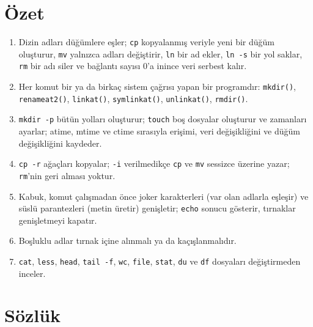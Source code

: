 \documentclass[11pt,a4paper]{article}
\newcommand{\cmd}[1]{\texttt{#1}}
\begin{document}
\section{Özet}

\begin{keyidea}
\begin{enumerate}[leftmargin=1.4em]
  \item Dizin adları düğümlere eşler; \cmd{cp} kopyalanmış veriyle yeni bir düğüm oluşturur, \cmd{mv} yalnızca adları değiştirir, \cmd{ln} bir ad ekler, \cmd{ln -s} bir yol saklar, \cmd{rm} bir adı siler ve bağlantı sayısı $0$'a inince veri serbest kalır.
  \item Her komut bir ya da birkaç sistem çağrısı yapan bir programdır: \cmd{mkdir()}, \cmd{renameat2()}, \cmd{linkat()}, \cmd{symlinkat()}, \cmd{unlinkat()}, \cmd{rmdir()}.
  \item \cmd{mkdir -p} bütün yolları oluşturur; \cmd{touch} boş dosyalar oluşturur ve zamanları ayarlar; atime, mtime ve ctime sırasıyla erişimi, veri değişikliğini ve düğüm değişikliğini kaydeder.
  \item \cmd{cp -r} ağaçları kopyalar; \cmd{-i} verilmedikçe \cmd{cp} ve \cmd{mv} sessizce üzerine yazar; \cmd{rm}'nin geri alması yoktur.
  \item Kabuk, komut çalışmadan önce joker karakterleri (var olan adlarla eşleşir) ve süslü parantezleri (metin üretir) genişletir; \cmd{echo} sonucu gösterir, tırnaklar genişletmeyi kapatır.
  \item Boşluklu adlar tırnak içine alınmalı ya da kaçışlanmalıdır.
  \item \cmd{cat}, \cmd{less}, \cmd{head}, \cmd{tail -f}, \cmd{wc}, \cmd{file}, \cmd{stat}, \cmd{du} ve \cmd{df} dosyaları değiştirmeden inceler.
\end{enumerate}
\end{keyidea}

\section{Sözlük}
\end{document}
